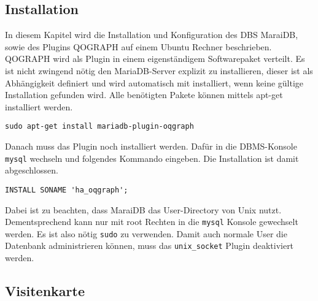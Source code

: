
\subsection{Installation}
In diesem Kapitel wird die Installation und Konfiguration des DBS MaraiDB, sowie des Plugins QOGRAPH auf einem Ubuntu Rechner beschrieben.  
QOGRAPH wird als Plugin in einem eigenständigem Softwarepaket verteilt. Es ist nicht zwingend nötig den MariaDB-Server explizit zu installieren, dieser ist als Abhängigkeit definiert und wird automatisch mit installiert, wenn keine gültige Installation gefunden wird. Alle benötigten Pakete können mittels apt-get installiert werden.
\begin{lstlisting}
sudo apt-get install mariadb-plugin-oqgraph
\end{lstlisting}
Danach muss das Plugin noch installiert werden. Dafür in die DBMS-Konsole \texttt{mysql} wechseln und folgendes Kommando eingeben. Die Installation ist damit abgeschlossen.
\begin{lstlisting}
INSTALL SONAME 'ha_oqgraph';
\end{lstlisting}

Dabei ist zu beachten, dass MaraiDB das User-Directory von Unix nutzt. Dementsprechend kann nur mit root Rechten in die \texttt{mysql} Konsole  gewechselt werden. Es ist also nötig \texttt{sudo} zu verwenden. Damit auch normale User die Datenbank administrieren können, muss das \texttt{unix\_socket} Plugin deaktiviert werden.

\subsection{Visitenkarte}

